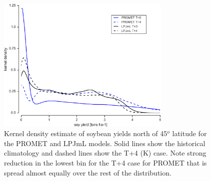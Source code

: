 \documentclass[gmd, manuscript]{copernicus} %
\begin{document}
\begin{figure}[ht]
\centering
   \includegraphics[width=8.3cm]{figures/testhighlatskde.png}
\caption{Kernel density estimate of soybean yields north of 45$^o$ latitude for the PROMET and LPJmL models. Solid lines show the historical climatology and dashed lines show the T+4 (K) case. Note strong reduction in the lowest bin for the T+4 case for PROMET that is spread almost equally over the rest of the distribution.}
\label{fig:highlat}
\end{figure}
\end{document}
